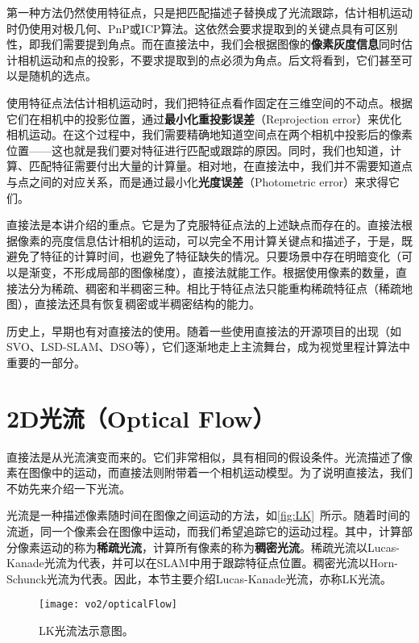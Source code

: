 第一种方法仍然使用特征点，只是把匹配描述子替换成了光流跟踪，估计相机运动时仍使用对极几何、PnP或ICP算法。这依然会要求提取到的关键点具有可区别性，即我们需要提到角点。而在直接法中，我们会根据图像的\textbf{像素灰度信息}同时估计相机运动和点的投影，不要求提取到的点必须为角点。后文将看到，它们甚至可以是随机的选点。

使用特征点法估计相机运动时，我们把特征点看作固定在三维空间的不动点。根据它们在相机中的投影位置，通过\textbf{最小化重投影误差}（Reprojection error）来优化相机运动。在这个过程中，我们需要精确地知道空间点在两个相机中投影后的像素位置——这也就是我们要对特征进行匹配或跟踪的原因。同时，我们也知道，计算、匹配特征需要付出大量的计算量。相对地，在直接法中，我们并不需要知道点与点之间的对应关系，而是通过最小化\textbf{光度误差}（Photometric error）来求得它们。

直接法是本讲介绍的重点。它是为了克服特征点法的上述缺点而存在的。直接法根据像素的亮度信息估计相机的运动，可以完全不用计算关键点和描述子，于是，既避免了特征的计算时间，也避免了特征缺失的情况。只要场景中存在明暗变化（可以是渐变，不形成局部的图像梯度），直接法就能工作。根据使用像素的数量，直接法分为稀疏、稠密和半稠密三种。相比于特征点法只能重构稀疏特征点（稀疏地图），直接法还具有恢复稠密或半稠密结构的能力。

历史上，早期也有对直接法的使用\textsuperscript{\cite{Silveira2008}}。随着一些使用直接法的开源项目的出现（如SVO\textsuperscript{\cite{Forster2014}}、LSD-SLAM\textsuperscript{\cite{Engel2014}}、DSO\textsuperscript{\cite{Engel2016}}等），它们逐渐地走上主流舞台，成为视觉里程计算法中重要的一部分。

\section{2D光流（Optical Flow）}
直接法是从光流演变而来的。它们非常相似，具有相同的假设条件。光流描述了像素在图像中的运动，而直接法则附带着一个相机运动模型。为了说明直接法，我们不妨先来介绍一下光流。

光流是一种描述像素随时间在图像之间运动的方法，如\autoref{fig:LK}~所示。随着时间的流逝，同一个像素会在图像中运动，而我们希望追踪它的运动过程。其中，计算部分像素运动的称为\textbf{稀疏光流}，计算所有像素的称为\textbf{稠密光流}。稀疏光流以Lucas-Kanade光流\textsuperscript{\cite{Lucas1981}}为代表，并可以在SLAM中用于跟踪特征点位置。稠密光流以Horn-Schunck光流\textsuperscript{\cite{Horn1981}}为代表。因此，本节主要介绍Lucas-Kanade光流，亦称LK光流。

\begin{figure}[!htp]
	\centering
	\texttt{[image: vo2/opticalFlow]}
	\caption{LK光流法示意图。}
	\label{fig:LK}
\end{figure}

